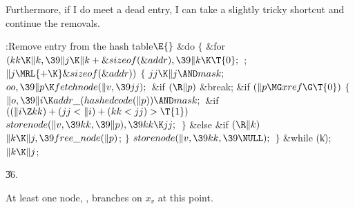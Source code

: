 Furthermore, if I do meet a dead entry, I can take a slightly tricky
shortcut and continue the removals.

\Y\B\4:Remove entry  from the hash table\X${}\E{}$\6
\&{do}\5
${}\{{}$\1\6
\&{for} ${}(\\{kk}\K\|k,\39\|j\K\|k+\&{sizeof}(\&{addr}),\39\|k\K\T{0};{}$  ;
${}\|j\MRL{+{\K}}\&{sizeof}(\&{addr})){}$\5
${}\{{}$\1\6
${}\\{jj}\K\|j\AND\\{mask};{}$\6
${}\\{oo},\39\|p\K\\{fetchnode}(\|v,\39\\{jj});{}$\6
\&{if} ${}(\R\|p){}$\1\5
\&{break};\2\6
\&{if} ${}(\|p\MG\\{xref}\G\T{0}){}$\5
${}\{{}$\1\6
${}\|o,\39\|i\K\\{addr\_}(\\{hashedcode}(\|p))\AND\\{mask};{}$\6
\&{if} ${}((\|i\Z\\{kk})+(\\{jj}<\|i)+(\\{kk}<\\{jj})>\T{1}){}$\1\5
${}\\{storenode}(\|v,\39\\{kk},\39\|p),\39\\{kk}\K\\{jj};{}$\2\6
\4${}\}{}$\5
\2\&{else} \&{if} ${}(\R\|k){}$\1\5
${}\|k\K\|j,\39\\{free\_node}(\|p){}$;\2\6
\4${}\}{}$\2\6
${}\\{storenode}(\|v,\39\\{kk},\39\NULL);{}$\6
\4${}\}{}$\2\5
\&{while} (\|k);\6
${}\|k\K\|j{}$;\par
\U36.\fi

At least one node, , branches on $x_v$
at this point.

